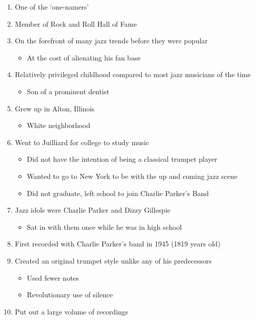 \documentclass[]{article}
\providecommand{\tightlist}{%
  \setlength{\itemsep}{0pt}\setlength{\parskip}{0pt}}
\begin{document}
\begin{enumerate}
\def\labelenumi{\arabic{enumi}.}
\tightlist
\item
  One of the `one-namers'
\item
  Member of Rock and Roll Hall of Fame
\item
  On the forefront of many jazz trends before they were popular

  \begin{itemize}
  \tightlist
  \item
    At the cost of alienating his fan base
  \end{itemize}
\item
  Relatively privileged childhood compared to most jazz musicians of the
  time

  \begin{itemize}
  \tightlist
  \item
    Son of a prominent dentist
  \end{itemize}
\item
  Grew up in Alton, Illinois

  \begin{itemize}
  \tightlist
  \item
    White neighborhood
  \end{itemize}
\item
  Went to Juilliard for college to study music

  \begin{itemize}
  \tightlist
  \item
    Did not have the intention of being a classical trumpet player
  \item
    Wanted to go to New York to be with the up and coming jazz scene
  \item
    Did not graduate, left school to join Charlie Parker's Band
  \end{itemize}
\item
  Jazz idols were Charlie Parker and Dizzy Gillespie

  \begin{itemize}
  \tightlist
  \item
    Sat in with them once while he was in high school
  \end{itemize}
\item
  First recorded with Charlie Parker's band in 1945 (1819 years old)
\item
  Created an original trumpet style unlike any of his predecessors

  \begin{itemize}
  \tightlist
  \item
    Used fewer notes
  \item
    Revolutionary use of silence
  \end{itemize}
\item
  Put out a large volume of recordings


\end{enumerate}
\end{document}
